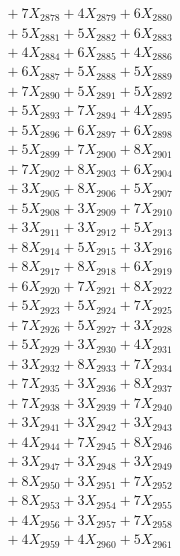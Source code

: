 \documentclass[a4paper,10pt]{article}
\begin{document}
{\begin{align}
&\;  + 7 X_{2878} + 4 X_{2879} + 6 X_{2880} \\[0.3ex]
&\;  + 5 X_{2881} + 5 X_{2882} + 6 X_{2883} \\[0.3ex]
&\;  + 4 X_{2884} + 6 X_{2885} + 4 X_{2886} \\[0.3ex]
&\;  + 6 X_{2887} + 5 X_{2888} + 5 X_{2889} \\[0.5ex]\allowbreak
&\;  + 7 X_{2890} + 5 X_{2891} + 5 X_{2892} \\[0.3ex]
&\;  + 5 X_{2893} + 7 X_{2894} + 4 X_{2895} \\[0.3ex]
&\;  + 5 X_{2896} + 6 X_{2897} + 6 X_{2898} \\[0.3ex]
&\;  + 5 X_{2899} + 7 X_{2900} + 8 X_{2901} \\[0.3ex]
&\;  + 7 X_{2902} + 8 X_{2903} + 6 X_{2904} \\[0.3ex]
&\;  + 3 X_{2905} + 8 X_{2906} + 5 X_{2907} \\[0.3ex]
&\;  + 5 X_{2908} + 3 X_{2909} + 7 X_{2910} \\[0.3ex]
&\;  + 3 X_{2911} + 3 X_{2912} + 5 X_{2913} \\[0.3ex]
&\;  + 8 X_{2914} + 5 X_{2915} + 3 X_{2916} \\[0.3ex]
&\;  + 8 X_{2917} + 8 X_{2918} + 6 X_{2919} \\[0.5ex]\allowbreak
&\;  + 6 X_{2920} + 7 X_{2921} + 8 X_{2922} \\[0.3ex]
&\;  + 5 X_{2923} + 5 X_{2924} + 7 X_{2925} \\[0.3ex]
&\;  + 7 X_{2926} + 5 X_{2927} + 3 X_{2928} \\[0.3ex]
&\;  + 5 X_{2929} + 3 X_{2930} + 4 X_{2931} \\[0.3ex]
&\;  + 3 X_{2932} + 8 X_{2933} + 7 X_{2934} \\[0.3ex]
&\;  + 7 X_{2935} + 3 X_{2936} + 8 X_{2937} \\[0.3ex]
&\;  + 7 X_{2938} + 3 X_{2939} + 7 X_{2940} \\[0.3ex]
&\;  + 3 X_{2941} + 3 X_{2942} + 3 X_{2943} \\[0.3ex]
&\;  + 4 X_{2944} + 7 X_{2945} + 8 X_{2946} \\[0.3ex]
&\;  + 3 X_{2947} + 3 X_{2948} + 3 X_{2949} \\[0.5ex]\allowbreak
&\;  + 8 X_{2950} + 3 X_{2951} + 7 X_{2952} \\[0.3ex]
&\;  + 8 X_{2953} + 3 X_{2954} + 7 X_{2955} \\[0.3ex]
&\;  + 4 X_{2956} + 3 X_{2957} + 7 X_{2958} \\[0.3ex]
&\;  + 4 X_{2959} + 4 X_{2960} + 5 X_{2961} \\[0.3ex]

\end{align}}
\end{document}
